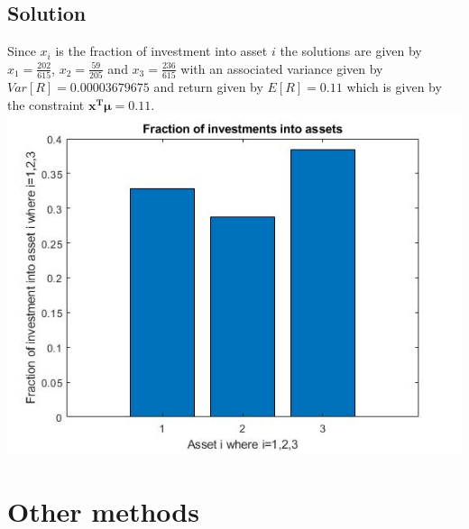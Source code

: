 \documentclass[11pt]{article}
\begin{document}
\subsection{Solution}
Since $x_{i}$ is the fraction of investment into asset $i$ the solutions are given by $x_{1}=\frac{202}{615}$, $x_{2}=\frac{59}{205}$ and $x_{3}=\frac{236}{615}$ with an associated variance given by $Var[R]=0.00003679675$ and return given by $E[R]=0.11$ which is given by the constraint $\mathbf{x^T}  \boldsymbol\mu = 0.11$. 
\newline \includegraphics[scale=0.6]{PSPfig1} 
\section{Other methods}
\end{document}
